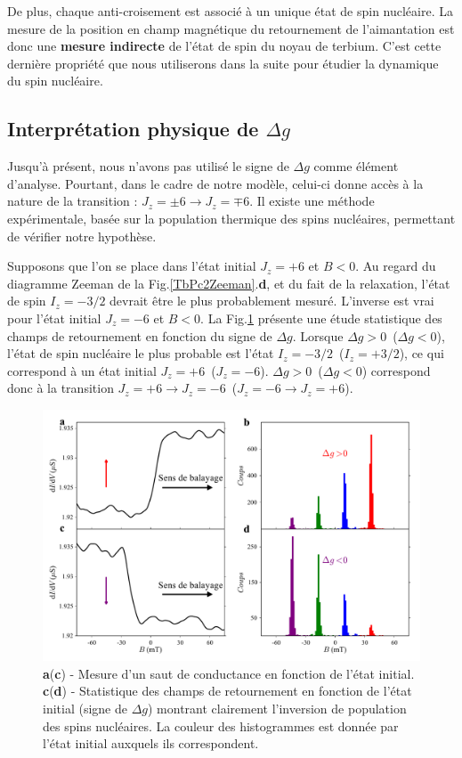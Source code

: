 De plus, chaque anti-croisement est associé à un unique état de spin nucléaire. La mesure de la position en champ magnétique du retournement de l'aimantation est donc une \textbf{mesure indirecte} de l'état de spin du noyau de terbium. C'est cette dernière propriété que nous utiliserons dans la suite pour étudier la dynamique du spin nucléaire.

\subsection{Interprétation physique de $\Delta g$}
Jusqu'à présent, nous n'avons pas utilisé le signe de $\Delta g$ comme élément d'analyse. Pourtant, dans le cadre de notre modèle, celui-ci donne accès à la nature de la transition : $J_z = \pm6 \rightarrow J_z = \mp 6$. Il existe une méthode expérimentale, basée sur la population thermique des spins nucléaires, permettant de vérifier notre hypothèse.

Supposons que l'on se place dans l'état initial $J_z=+6$ et $B<0$. Au regard du diagramme Zeeman de la Fig.\ref{TbPc2Zeeman}.\textbf{d}, et du fait de la relaxation, l'état de spin $I_z = -3/2$ devrait être le plus probablement mesuré. L'inverse est vrai pour l'état initial $J_z=-6$ et $B<0$. La Fig.\ref{analyse_signe_saut} présente une étude statistique des champs de retournement en fonction du signe de $\Delta g$. Lorsque $\Delta g> 0$~($\Delta g< 0$), l'état de spin nucléaire le plus probable est l'état $I_z = -3/2$~($I_z = +3/2$), ce qui correspond à un état initial $J_z=+6$~($J_z=-6$). $\Delta g> 0$~($\Delta g< 0$) correspond donc à la transition $J_z = +6 \rightarrow J_z =  - 6$~($J_z = -6 \rightarrow J_z =  + 6$).

\begin{figure}
\includegraphics[scale=0.45]{Resultats/JumpSens/JumpSens.pdf} 
\caption{\textbf{a}(\textbf{c}) - Mesure d'un saut de conductance en fonction de l'état initial. \textbf{c}(\textbf{d}) - Statistique des champs de retournement en fonction de l'état initial (signe de $\Delta g$) montrant clairement l'inversion de population des spins nucléaires. La couleur des histogrammes est donnée par l'état initial auxquels ils correspondent.}
\label{analyse_signe_saut}
\end{figure}

